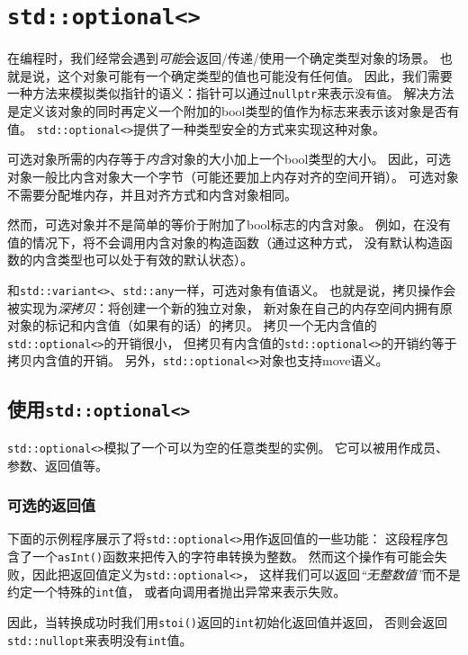 \chapter{\texttt{std::optional<>}}\label{ch15}
在编程时，我们经常会遇到\emph{可能}会返回/传递/使用一个确定类型对象的场景。
也就是说，这个对象可能有一个确定类型的值也可能没有任何值。
因此，我们需要一种方法来模拟类似指针的语义：指针可以通过\texttt{nullptr}来表示\texttt{没有值}。
解决方法是定义该对象的同时再定义一个附加的bool类型的值作为标志来表示该对象是否有值。
\texttt{std::optional<>}提供了一种类型安全的方式来实现这种对象。

可选对象所需的内存等于\emph{内含}对象的大小加上一个bool类型的大小。
因此，可选对象一般比内含对象大一个字节（可能还要加上内存对齐的空间开销）。
可选对象不需要分配堆内存，并且对齐方式和内含对象相同。

然而，可选对象并不是简单的等价于附加了bool标志的内含对象。
例如，在没有值的情况下，将不会调用内含对象的构造函数（通过这种方式，
没有默认构造函数的内含类型也可以处于有效的默认状态）。

和\texttt{std::variant<>}、\texttt{std::any}一样，可选对象有值语义。
也就是说，拷贝操作会被实现为\emph{深拷贝}：将创建一个新的独立对象，
新对象在自己的内存空间内拥有原对象的标记和内含值（如果有的话）的拷贝。
拷贝一个无内含值的\texttt{std::optional<>}的开销很小，
但拷贝有内含值的\texttt{std::optional<>}的开销约等于拷贝内含值的开销。
另外，\texttt{std::optional<>}对象也支持move语义。


\section{使用\texttt{std::optional<>}}
\texttt{std::optional<>}模拟了一个可以为空的任意类型的实例。
它可以被用作成员、参数、返回值等。

\subsection{可选的返回值}\label{ch15.1.1}
下面的示例程序展示了将\texttt{std::optional<>}用作返回值的一些功能：
这段程序包含了一个\texttt{asInt()}函数来把传入的字符串转换为整数。
然而这个操作有可能会失败，因此把返回值定义为\texttt{std::optional<>}，
这样我们可以返回\emph{“无整数值”}而不是约定一个特殊的\texttt{int}值，
或者向调用者抛出异常来表示失败。

因此，当转换成功时我们用\texttt{stoi()}返回的\texttt{int}初始化返回值并返回，
否则会返回\texttt{std::nullopt}来表明没有\texttt{int}值。


